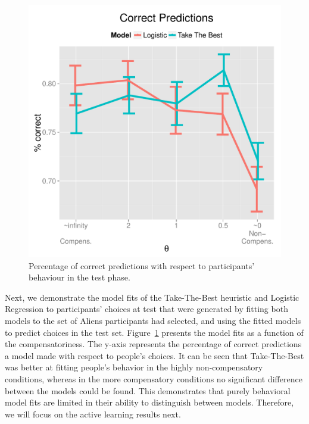 \documentclass[10pt,letterpaper]{article}
\begin{document}
\begin{figure}[htb!]
	\centering
			\caption{Percentage of correct predictions with respect to participants' behaviour in the test phase.}
	\label{percentage}
	\centering
	\includegraphics[scale=0.4]{percentage.pdf}

\end{figure}

Next, we demonstrate the model fits of the Take-The-Best heuristic and Logistic Regression to participants' choices at test that were generated by fitting both models to the set of Aliens participants had selected, and using the fitted models to predict choices in the test set. Figure~\ref{percentage} presents the model fits as a function of the compensatoriness. The y-axis represents the percentage of correct predictions a model made with respect to people's choices. It can be seen that Take-The-Best was better at fitting people's behavior in the highly non-compensatory conditions,  whereas in the more compensatory conditions no significant difference between the models could be found. This demonstrates that purely behavioral model fits are limited in their ability to distinguish between models. Therefore, we will focus on the active learning results next.\\
\end{document}
